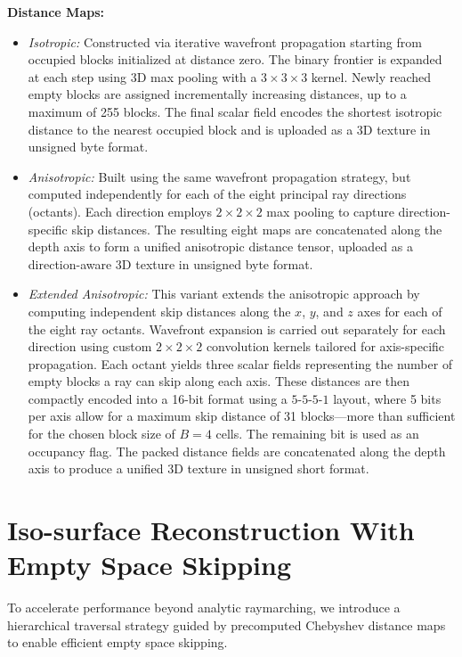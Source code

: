 \documentclass[conference]{IEEEtran}
\begin{document}
\vspace{0.5em}
\noindent\textbf{Distance Maps:}
\begin{itemize}
\item \textit{Isotropic:} 
Constructed via iterative wavefront propagation starting from occupied blocks initialized at distance zero. The binary frontier is expanded at each step using 3D max pooling with a \(3 \times 3 \times 3\) kernel. Newly reached empty blocks are assigned incrementally increasing distances, up to a maximum of 255 blocks. The final scalar field encodes the shortest isotropic distance to the nearest occupied block and is uploaded as a 3D texture in unsigned byte format.

\item \textit{Anisotropic:} 
Built using the same wavefront propagation strategy, but computed independently for each of the eight principal ray directions (octants). Each direction employs \(2 \times 2 \times 2\) max pooling to capture direction-specific skip distances. The resulting eight maps are concatenated along the depth axis to form a unified anisotropic distance tensor, uploaded as a direction-aware 3D texture in unsigned byte format.

\item \textit{Extended Anisotropic:} 
This variant extends the anisotropic approach by computing independent skip distances along the $x$, $y$, and $z$ axes for each of the eight ray octants. Wavefront expansion is carried out separately for each direction using custom $2 \times 2 \times 2$ convolution kernels tailored for axis-specific propagation. Each octant yields three scalar fields representing the number of empty blocks a ray can skip along each axis. These distances are then compactly encoded into a 16-bit format using a $5\text{-}5\text{-}5\text{-}1$ layout, where 5 bits per axis allow for a maximum skip distance of 31 blocks—more than sufficient for the chosen block size of $B = 4$ cells. The remaining bit is used as an occupancy flag. The packed distance fields are concatenated along the depth axis to produce a unified 3D texture in unsigned short format.

\end{itemize}

\section{Iso-surface Reconstruction With Empty Space Skipping}

To accelerate performance beyond analytic raymarching, we introduce a hierarchical traversal strategy guided by precomputed Chebyshev distance maps to enable efficient empty space skipping.
\end{document}
